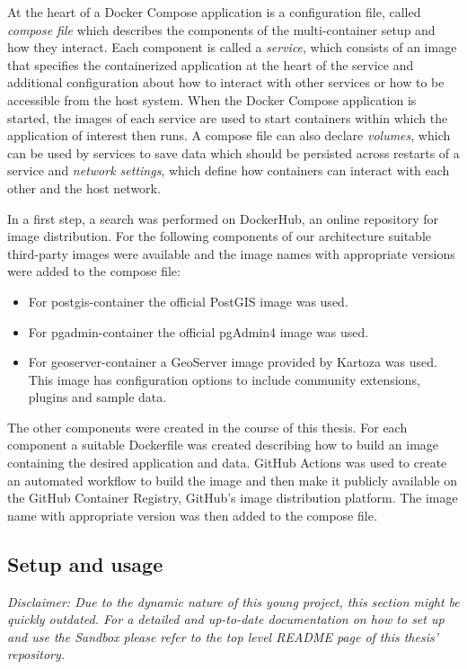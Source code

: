 \documentclass[11pt, a4paper, oneside, parskip=full-]{scrartcl}
\begin{document}
At the heart of a Docker Compose application is a configuration file, called
\emph{compose file} which describes the components of the multi-container setup
and how they interact. Each component is called a \emph{service}, which consists
of an image that specifies the containerized application at the heart of the
service and additional configuration about how to interact with other services
or how to be accessible from the host system. When the Docker Compose
application is started, the images of each service are used to start containers
within which the application of interest then runs. A compose file can also
declare \emph{volumes}, which can be used by services to save data which should
be persisted across restarts of a service and \emph{network settings}, which
define how containers can interact with each other and the host network.

In a first step, a search was performed on DockerHub\cite{dockerhub}, an online
repository for image distribution. For the following components of our
architecture suitable third-party images were available and the image names with
appropriate versions were added to the compose file:

\begin{itemize}
  \item For postgis-container the official PostGIS image was
  used\cite{postgis-container}.
  \item For pgadmin-container the official pgAdmin4 image was
  used\cite{pgadmin-container}.
  \item For geoserver-container a GeoServer image provided by Kartoza was
  used\cite{geoserver-container}. This image has configuration options to
  include community extensions, plugins and sample data.
\end{itemize}

The other components were created in the course of this thesis. For each
component a suitable Dockerfile was created describing how to build an image
containing the desired application and data. GitHub Actions\cite{githubactions}
was used to create an automated workflow to build the image and then make it
publicly available on the GitHub Container Registry\cite{gcr}, GitHub's image
distribution platform. The image name with appropriate version was then added to
the compose file.

\subsection{Setup and usage}
\emph{Disclaimer: Due to the dynamic nature of this young project, this section
might be quickly outdated. For a detailed and up-to-date documentation on how to
set up and use the Sandbox please refer to the top level README page of this
thesis' repository\cite{osgeostacksandbox}.}
\end{document}
